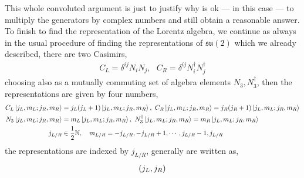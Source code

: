 This whole convoluted argument is just to justify why is ok --- in this case --- to multiply the generators by complex numbers and still obtain a reasonable answer. To finish to find the 
representation of the Lorentz algebra, we continue as always in the usual procedure of finding the representations of $\mathfrak{su}(2)$ which we already described, there are two 
Casimirs, 
\begin{align}
    C_L=\delta^{ij}N_i N_j,\ \ \  C_R = \delta^{ij}N^\dagger_i N^\dagger_j
\end{align}
choosing also as a mutually commuting set of algebra elements $N_3,N^\dagger_3$, then the representations are given by four numbers,
\begin{align}
    C_L\ket{j_L,m_L;j_R,m_R} &= j_L\qty(j_L+1)\ket{j_L,m_L;j_R,m_R} ,\ C_R\ket{j_L,m_L;j_R,m_R} = j_R\qty(j_R+1)\ket{j_L,m_L;j_R,m_R}\\
    N_3\ket{j_L,m_L;j_R,m_R} &= m_L \ket{j_L,m_L;j_R,m_R}, \ N^\dagger_3\ket{j_L,m_L;j_R,m_R} = m_R \ket{j_L,m_L;j_R,m_R}\\
    j_{L/R} &\in\frac12\mathbb N,\ \ \ m_{L/R} = -j_{L/R},-j_{L/R}+1,\cdots,j_{L/R}-1,j_{L/R}
\end{align}
the representations are indexed by $j_{L/R}$, generally are written as,
\begin{align}
    \qty(j_L,j_R)
\end{align}

